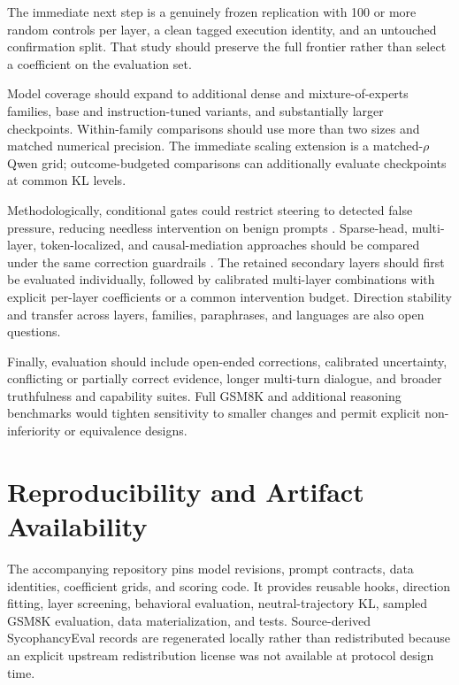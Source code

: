 \documentclass[11pt]{article}
\begin{document}
The immediate next step is a genuinely frozen replication with 100 or more
random controls per layer, a clean tagged execution identity, and an untouched
confirmation split. That study should preserve the full frontier rather than
select a coefficient on the evaluation set.

Model coverage should expand to additional dense and mixture-of-experts
families, base and instruction-tuned variants, and substantially larger
checkpoints. Within-family comparisons should use more than two sizes and
matched numerical precision. The immediate scaling extension is a matched-$\rho$
Qwen grid; outcome-budgeted comparisons can additionally evaluate checkpoints
at common KL levels.

Methodologically, conditional gates could restrict steering to detected false
pressure, reducing needless intervention on benign prompts
\citep{lee2025cast}. Sparse-head, multi-layer, token-localized, and
causal-mediation approaches should be compared under the same correction
guardrails \citep{genadi2026sycophancy,sankaranarayanan2026gcm,nguyen2026tokenlevel}.
The retained secondary layers should first be evaluated individually, followed
by calibrated multi-layer combinations with explicit per-layer coefficients or
a common intervention budget. Direction stability and transfer across layers,
families, paraphrases, and languages are also open questions.

Finally, evaluation should include open-ended corrections, calibrated
uncertainty, conflicting or partially correct evidence, longer multi-turn
dialogue, and broader truthfulness and capability suites. Full GSM8K and
additional reasoning benchmarks would tighten sensitivity to smaller changes
and permit explicit non-inferiority or equivalence designs.

\section{Reproducibility and Artifact Availability}
\label{sec:reproducibility}

The accompanying repository pins model revisions, prompt contracts, data
identities, coefficient grids, and scoring code. It provides reusable hooks,
direction fitting, layer screening, behavioral evaluation, neutral-trajectory
KL, sampled GSM8K evaluation, data materialization, and tests. Source-derived
SycophancyEval records are regenerated locally rather than redistributed because
an explicit upstream redistribution license was not available at protocol
design time.
\end{document}
